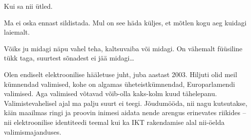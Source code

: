 


Kui sa nii ütled.


Ma ei oska ennast sildistada. Mul on see häda küljes, et mõtlen kogu aeg kuidagi 
laiemalt.


Võiks ju midagi näpu vahel teha, kaltsuvaiba või midagi. On vähemalt füüsiline tükk taga, 
suurtest sõnadest ei jää midagi\ldots


Olen endiselt elektroonilise hääletuse juht, juba aastast 2003. 
Hiljuti olid meil kümnendad valimised, kohe on algamas üheteistkümnendad, 
Europarlamendi valimised. Aga valimised võtavad võib-olla 
kaks-kolm kuud tähelepanu. Valimistevahelisel ajal ma palju 
suurt ei teegi. Jõudumööda, nii nagu kutsutakse, käin maailmas ringi ja proovin 
inimesi aidata nende arengus erinevates riikides – nii 
elektroonilise identiteedi teemal kui ka IKT rakendamise alal 
nii-öelda valimismajanduses.

